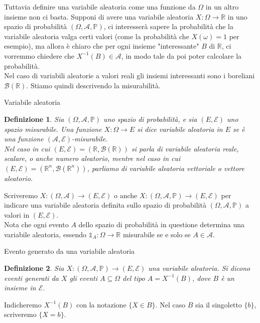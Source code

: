 \documentclass[11pt]{book}
\theoremstyle{Definizione}
\newtheorem*{mydef}{Definizione}
\theoremstyle{TeoremaProposizioneLemmaCorollario}
\theoremstyle{OsservazioneNota}
\newcommand{\R}{\mathbb{R}}
\renewcommand{\P}{\mathbb{P}}
\newcommand{\Borel}{\mathcal{B}}
\newcommand{\uno}[1]{\mathds{1}_{#1}}
\begin{document}
Tuttavia definire una variabile aleatoria come una funzione da $\Omega$ in un altro insieme non ci basta. Supponi di avere una variabile aleatoria $X:\Omega\longrightarrow \R$ in uno spazio di probabilità $(\Omega,\mathcal{A},\P)$, ci interesserà sapere la probabilità che la variabile aleatoria valga certi valori (come la probabilità che $X(\omega) = 1$ per esempio), ma allora è chiaro che per ogni insieme "interessante" $B$ di $\R$, ci vorremmo chiedere che $X^{-1}(B) \in \mathcal{A}$, in modo tale da poi poter calcolare la probabilità.\\
Nel caso di variabili aleatorie a valori reali gli insiemi interessanti sono i boreliani $\Borel(\R)$. Stiamo quindi descrivendo la misurabilità.
\begin{boxdef}{Variabile aleatoria}
\begin{mydef}
Sia $(\Omega,\mathcal{A},\P)$ uno spazio di probabilità, e sia $(E,\mathcal{E})$ uno spazio misurabile. Una funzione $X:\Omega\longrightarrow E$ si dice variabile aleatoria in $E$ se è una funzione $(\mathcal{A},\mathcal{E})$-misurabile.\\
Nel caso in cui $(E,\mathcal{E}) = (\R,\Borel(\R))$ si parla di variabile aleatoria reale, scalare, o anche numero aleatorio, mentre nel caso in cui $(E,\mathcal{E}) = (\R^n,\Borel(\R^n))$, parliamo di variabile aleatoria vettoriale o vettore aleatorio.
\end{mydef}
\end{boxdef}
\noindent
Scriveremo $X:(\Omega,\mathcal{A})\longrightarrow (E,\mathcal{E})$ o anche $X:(\Omega,\mathcal{A},\P) \longrightarrow (E,\mathcal{E})$ per indicare una variabile aleatoria definita sullo spazio di probabilità $(\Omega,\mathcal{A},\P)$ a valori in $(E,\mathcal{E})$.\\
Nota che ogni evento $A$ dello spazio di probabilità in questione determina una variabile aleatoria, essendo $\uno{A}:\Omega\longrightarrow \R$ misurabile se e solo se $A\in \mathcal{A}$.
\begin{boxdef}{Evento generato da una variabile aleatoria}
\begin{mydef}
Sia $X:(\Omega,\mathcal{A},\P)\longrightarrow (E,\mathcal{E})$ una variabile aleatoria. Si dicono eventi generati da $X$ gli eventi $A\subseteq \Omega$ del tipo $A = X^{-1}(B)$, dove $B$ è un insieme in $\mathcal{E}$.
\end{mydef}
\end{boxdef}
\noindent
Indicheremo $X^{-1}(B)$ con la notazione $\{X\in B\}$. Nel caso $B$ sia il singoletto $\{b\}$, scriveremo $\{X = b\}$.\\
\end{document}
